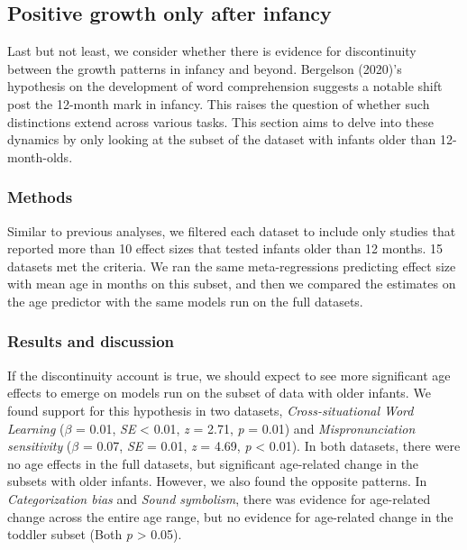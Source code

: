 \documentclass[
  man]{apa6}
\begin{document}
\hypertarget{positive-growth-only-after-infancy}{%
\subsection{Positive growth only after infancy}\label{positive-growth-only-after-infancy}}

Last but not least, we consider whether there is evidence for discontinuity between the growth patterns in infancy and beyond. Bergelson (2020)'s hypothesis on the development of word comprehension suggests a notable shift post the 12-month mark in infancy. This raises the question of whether such distinctions extend across various tasks. This section aims to delve into these dynamics by only looking at the subset of the dataset with infants older than 12-month-olds.

\hypertarget{methods-4}{%
\subsubsection{Methods}\label{methods-4}}

Similar to previous analyses, we filtered each dataset to include only studies that reported more than 10 effect sizes that tested infants older than 12 months. 15 datasets met the criteria. We ran the same meta-regressions predicting effect size with mean age in months on this subset, and then we compared the estimates on the age predictor with the same models run on the full datasets.

\hypertarget{results-and-discussion-3}{%
\subsubsection{Results and discussion}\label{results-and-discussion-3}}

If the discontinuity account is true, we should expect to see more significant age effects to emerge on models run on the subset of data with older infants. We found support for this hypothesis in two datasets, \emph{Cross-situational Word Learning} (\(\beta\) = 0.01, \emph{SE} \textless{} 0.01, \emph{z} = 2.71, \emph{p} = 0.01) and \emph{Mispronunciation sensitivity} (\(\beta\) = 0.07, \emph{SE} = 0.01, \emph{z} = 4.69, \emph{p} \textless{} 0.01). In both datasets, there were no age effects in the full datasets, but significant age-related change in the subsets with older infants. However, we also found the opposite patterns. In \emph{Categorization bias} and \emph{Sound symbolism}, there was evidence for age-related change across the entire age range, but no evidence for age-related change in the toddler subset (Both \emph{p} \textgreater{} 0.05).
\end{document}
